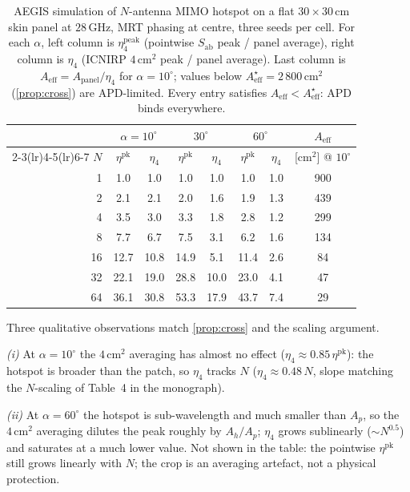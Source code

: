 \documentclass[journal]{IEEEtran}
\newcommand{\Sab}{S_{\mathrm{ab}}}
\newcommand{\Aeff}{A_{\mathrm{eff}}}
\begin{document}
\begin{table}[!t]
\centering
\caption{AEGIS simulation of $N$-antenna MIMO hotspot on a flat
$30\!\times\!30$\,cm skin panel at $28$\,GHz, MRT phasing at centre,
three seeds per cell. For each $\alpha$, left column is
$\eta_4^{\mathrm{peak}}$ (pointwise $\Sab$ peak / panel average), right
column is $\eta_4$ (ICNIRP $4\,\mathrm{cm}^2$ peak / panel average).
Last column is $\Aeff=A_{\mathrm{panel}}/\eta_4$ for $\alpha=10^\circ$;
values below $\Aeff^\star\!=\!2\,800\,\mathrm{cm}^2$ (\cref{prop:cross})
are APD-limited. Every entry satisfies $\Aeff\!<\!\Aeff^\star$: APD
binds everywhere.}
\label{tab:eta4}
\begin{tabular}{r cc cc cc c}
\toprule
 & \multicolumn{2}{c}{$\alpha\!=\!10^\circ$}
 & \multicolumn{2}{c}{$30^\circ$}
 & \multicolumn{2}{c}{$60^\circ$}
 & $\Aeff$ \\
\cmidrule(lr){2-3}\cmidrule(lr){4-5}\cmidrule(lr){6-7}
$N$ & $\eta^{\mathrm{pk}}$ & $\eta_4$ & $\eta^{\mathrm{pk}}$ & $\eta_4$
    & $\eta^{\mathrm{pk}}$ & $\eta_4$ & [cm$^2$] @ $10^\circ$\\
\midrule
  1 &  1.0 &  1.0 &  1.0 &  1.0 &  1.0 &  1.0 &    900 \\
  2 &  2.1 &  2.1 &  2.0 &  1.6 &  1.9 &  1.3 &    439 \\
  4 &  3.5 &  3.0 &  3.3 &  1.8 &  2.8 &  1.2 &    299 \\
  8 &  7.7 &  6.7 &  7.5 &  3.1 &  6.2 &  1.6 &    134 \\
 16 & 12.7 & 10.8 & 14.9 &  5.1 & 11.4 &  2.6 &   \phantom{0}84 \\
 32 & 22.1 & 19.0 & 28.8 & 10.0 & 23.0 &  4.1 &   \phantom{0}47 \\
 64 & 36.1 & 30.8 & 53.3 & 17.9 & 43.7 &  7.4 &   \phantom{0}29 \\
\bottomrule
\end{tabular}
\end{table}

Three qualitative observations match \cref{prop:cross} and the
scaling argument.

\emph{(i)} At $\alpha\!=\!10^\circ$ the $4\,\mathrm{cm}^2$ averaging
has almost no effect ($\eta_4\!\approx\!0.85\,\eta^{\mathrm{pk}}$): the
hotspot is broader than the patch, so $\eta_4$ tracks $N$
($\eta_4\!\approx\!0.48\,N$, slope matching the $N$-scaling of
Table~4 in the monograph).

\emph{(ii)} At $\alpha\!=\!60^\circ$ the hotspot is sub-wavelength and
much smaller than $A_p$, so the $4\,\mathrm{cm}^2$ averaging dilutes
the peak roughly by $A_h/A_p$; $\eta_4$ grows sublinearly
($\sim N^{0.5}$) and saturates at a much lower value. Not shown in
the table: the pointwise $\eta^{\mathrm{pk}}$ still grows linearly with
$N$; the crop is an averaging artefact, not a physical protection.
\end{document}
